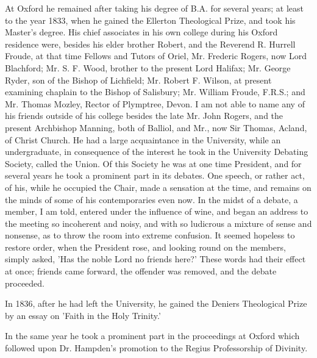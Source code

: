 At Oxford he remained after taking his degree of
B.A. for several years; at least to the year 1833, when he gained the
Ellerton Theological Prize, and took his Master's degree. His chief
associates in his own college during his Oxford residence were,
besides his elder brother Robert, and the Reverend R. Hurrell Froude,
at that time Fellows and Tutors of Oriel, Mr. Frederic Rogers, now
Lord Blachford; Mr. S. F. Wood, brother to the present Lord Halifax;
Mr. George Ryder, son of the Bishop of Lichfield; Mr. Robert F.
Wilson, at present examining chaplain to the Bishop of Salisbury; Mr.
William Froude, F.R.S.; and Mr. Thomas Mozley, Rector of Plymptree,
Devon. I am not able to name any of his friends outside of his
college besides the late Mr. John Rogers, and the present Archbishop
Manning, both of Balliol, and Mr., now Sir Thomas, Acland, of Christ
Church. He had a large acquaintance in the University, while an
undergraduate, in consequence of the interest he took in the
University Debating Society, called the Union. Of this Society he was
at one time President, and for several years he took a prominent part
in its debates. One speech, or rather act, of his, while he occupied
the Chair, made a sensation at the time, and remains on the minds of
some of his contemporaries even now. In the midst of a debate, a
member, I am told, entered under the influence of wine, and began an
address to the meeting so incoherent and noisy, and with so ludicrous
a mixture of sense and nonsense, as to throw the room into extreme
confusion. It seemed hopeless to restore order, when the President
rose, and looking round on the members, simply asked, 'Has the noble
Lord no friends here?' These words had their effect at once; friends
came forward, the offender was removed, and the debate proceeded.

In 1836, after he had left the University, he
gained the Deniers Theological Prize by an essay on 'Faith in the
Holy Trinity.'

In the same year he took a prominent part in the
proceedings at Oxford which followed upon Dr. Hampden's promotion to
the Regius Professorship of Divinity.

